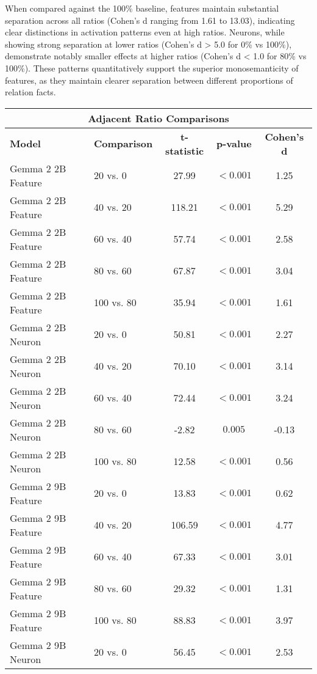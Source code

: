 When compared against the 100\% baseline, features maintain substantial separation across all ratios (Cohen's d ranging from 1.61 to 13.03), indicating clear distinctions in activation patterns even at high ratios. Neurons, while showing strong separation at lower ratios (Cohen's d > 5.0 for 0\% vs 100\%), demonstrate notably smaller effects at higher ratios (Cohen's d < 1.0 for 80\% vs 100\%). These patterns quantitatively support the superior monosemanticity of features, as they maintain clearer separation between different proportions of relation facts.

\begin{table*}[h]
\centering
\begin{tabular}{llccc}
\toprule
\multicolumn{5}{c}{\textbf{Adjacent Ratio Comparisons}} \\
\toprule
\textbf{Model} & \textbf{Comparison} & \textbf{t-statistic} & \textbf{p-value} & \textbf{Cohen's d} \\
\midrule
Gemma 2 2B Feature & 20 vs. 0 & 27.99 & $<0.001$ & 1.25 \\
Gemma 2 2B Feature & 40 vs. 20 & 118.21 & $<0.001$ & 5.29 \\
Gemma 2 2B Feature & 60 vs. 40 & 57.74 & $<0.001$ & 2.58 \\
Gemma 2 2B Feature & 80 vs. 60 & 67.87 & $<0.001$ & 3.04 \\
Gemma 2 2B Feature & 100 vs. 80 & 35.94 & $<0.001$ & 1.61 \\
\midrule
Gemma 2 2B Neuron & 20 vs. 0 & 50.81 & $<0.001$ & 2.27 \\
Gemma 2 2B Neuron & 40 vs. 20 & 70.10 & $<0.001$ & 3.14 \\
Gemma 2 2B Neuron & 60 vs. 40 & 72.44 & $<0.001$ & 3.24 \\
Gemma 2 2B Neuron & 80 vs. 60 & -2.82 & $0.005$ & -0.13 \\
Gemma 2 2B Neuron & 100 vs. 80 & 12.58 & $<0.001$ & 0.56 \\
\midrule
Gemma 2 9B Feature & 20 vs. 0 & 13.83 & $<0.001$ & 0.62 \\
Gemma 2 9B Feature & 40 vs. 20 & 106.59 & $<0.001$ & 4.77 \\
Gemma 2 9B Feature & 60 vs. 40 & 67.33 & $<0.001$ & 3.01 \\
Gemma 2 9B Feature & 80 vs. 60 & 29.32 & $<0.001$ & 1.31 \\
Gemma 2 9B Feature & 100 vs. 80 & 88.83 & $<0.001$ & 3.97 \\
\midrule
Gemma 2 9B Neuron & 20 vs. 0 & 56.45 & $<0.001$ & 2.53 \\

\end{tabular}
\end{table*}
